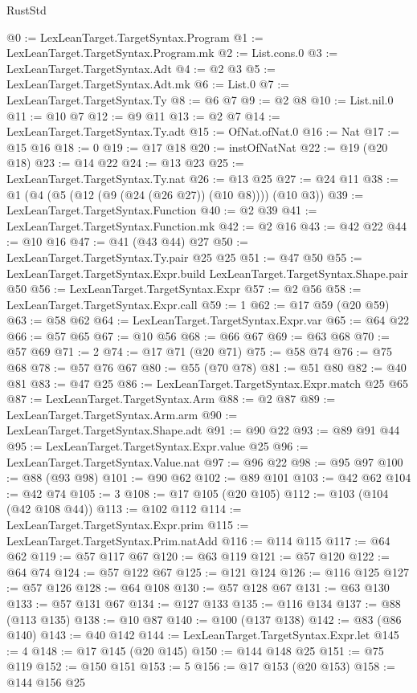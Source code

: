\begin{lexlean}{RustStd}
\begin{coremodule}
@0 := LexLeanTarget.TargetSyntax.Program
@1 := LexLeanTarget.TargetSyntax.Program.mk
@2 := List.cons.{0}
@3 := LexLeanTarget.TargetSyntax.Adt
@4 := @2 @3
@5 := LexLeanTarget.TargetSyntax.Adt.mk
@6 := List.{0}
@7 := LexLeanTarget.TargetSyntax.Ty
@8 := @6 @7
@9 := @2 @8
@10 := List.nil.{0}
@11 := @10 @7
@12 := @9 @11
@13 := @2 @7
@14 := LexLeanTarget.TargetSyntax.Ty.adt
@15 := OfNat.ofNat.{0}
@16 := Nat
@17 := @15 @16
@18 := 0
@19 := @17 @18
@20 := instOfNatNat
@22 := @19 (@20 @18)
@23 := @14 @22
@24 := @13 @23
@25 := LexLeanTarget.TargetSyntax.Ty.nat
@26 := @13 @25
@27 := @24 @11
@38 := @1 (@4 (@5 (@12 (@9 (@24 (@26 @27)) (@10 @8)))) (@10 @3))
@39 := LexLeanTarget.TargetSyntax.Function
@40 := @2 @39
@41 := LexLeanTarget.TargetSyntax.Function.mk
@42 := @2 @16
@43 := @42 @22
@44 := @10 @16
@47 := @41 (@43 @44) @27
@50 := LexLeanTarget.TargetSyntax.Ty.pair @25 @25
@51 := @47 @50
@55 := LexLeanTarget.TargetSyntax.Expr.build LexLeanTarget.TargetSyntax.Shape.pair @50
@56 := LexLeanTarget.TargetSyntax.Expr
@57 := @2 @56
@58 := LexLeanTarget.TargetSyntax.Expr.call
@59 := 1
@62 := @17 @59 (@20 @59)
@63 := @58 @62
@64 := LexLeanTarget.TargetSyntax.Expr.var
@65 := @64 @22
@66 := @57 @65
@67 := @10 @56
@68 := @66 @67
@69 := @63 @68
@70 := @57 @69
@71 := 2
@74 := @17 @71 (@20 @71)
@75 := @58 @74
@76 := @75 @68
@78 := @57 @76 @67
@80 := @55 (@70 @78)
@81 := @51 @80
@82 := @40 @81
@83 := @47 @25
@86 := LexLeanTarget.TargetSyntax.Expr.match @25 @65
@87 := LexLeanTarget.TargetSyntax.Arm
@88 := @2 @87
@89 := LexLeanTarget.TargetSyntax.Arm.arm
@90 := LexLeanTarget.TargetSyntax.Shape.adt
@91 := @90 @22
@93 := @89 @91 @44
@95 := LexLeanTarget.TargetSyntax.Expr.value @25
@96 := LexLeanTarget.TargetSyntax.Value.nat
@97 := @96 @22
@98 := @95 @97
@100 := @88 (@93 @98)
@101 := @90 @62
@102 := @89 @101
@103 := @42 @62
@104 := @42 @74
@105 := 3
@108 := @17 @105 (@20 @105)
@112 := @103 (@104 (@42 @108 @44))
@113 := @102 @112
@114 := LexLeanTarget.TargetSyntax.Expr.prim
@115 := LexLeanTarget.TargetSyntax.Prim.natAdd
@116 := @114 @115
@117 := @64 @62
@119 := @57 @117 @67
@120 := @63 @119
@121 := @57 @120
@122 := @64 @74
@124 := @57 @122 @67
@125 := @121 @124
@126 := @116 @125
@127 := @57 @126
@128 := @64 @108
@130 := @57 @128 @67
@131 := @63 @130
@133 := @57 @131 @67
@134 := @127 @133
@135 := @116 @134
@137 := @88 (@113 @135)
@138 := @10 @87
@140 := @100 (@137 @138)
@142 := @83 (@86 @140)
@143 := @40 @142
@144 := LexLeanTarget.TargetSyntax.Expr.let
@145 := 4
@148 := @17 @145 (@20 @145)
@150 := @144 @148 @25
@151 := @75 @119
@152 := @150 @151
@153 := 5
@156 := @17 @153 (@20 @153)
@158 := @144 @156 @25

\end{coremodule}
\end{lexlean}
